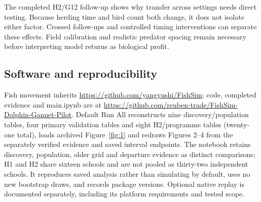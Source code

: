 \documentclass[10pt,a4paper,twocolumn]{article}
\begin{document}
The completed H2/G12 follow-up shows why transfer across settings needs direct testing. Because herding time and bird count both change, it does not isolate either factor. Crossed follow-ups and controlled timing interventions can separate these effects. Field calibration and realistic predator spacing remain necessary before interpreting model returns as biological profit.

\subsection{Software and reproducibility}
Fish movement inherits \url{https://github.com/yangyushi/FishSim}; code, completed evidence and main.ipynb are at \url{https://github.com/reuben-trade/FishSim-Dolphin-Gannet-Pilot}. Default Run All reconstructs nine discovery/population tables, four primary validation tables and eight H2/programme tables (twenty-one total), loads archived Figure~\ref{fig:1} and redraws Figures 2--4 from the separately verified evidence and saved interval endpoints. The notebook retains discovery, population, older grid and departure evidence as distinct comparisons; H1 and H2 share sixteen schools and are not pooled as thirty-two independent schools. It reproduces saved analysis rather than simulating by default, uses no new bootstrap draws, and records package versions. Optional native replay is documented separately, including its platform requirements and tested scope.
\end{document}
